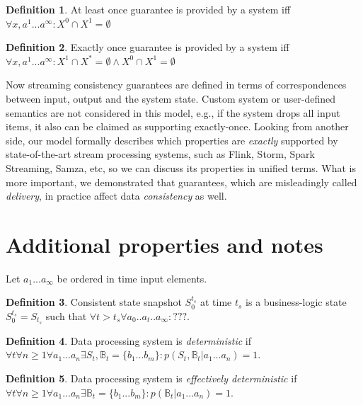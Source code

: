 \documentclass[sigconf]{acmart}
\theoremstyle{definition}
\newtheorem{definition}{Definition}
\begin{document}
\begin{definition}{At least once}
guarantee is provided by a system iff $\forall{x,a^{1}...a^\infty}:X^{0}\cap{X^{1}}=\emptyset$
\end{definition}

\begin{definition}{Exactly once}
guarantee is provided by a system iff $\forall{x,a^{1}...a^\infty}:X^{1}\cap{X^{*}}=\emptyset \wedge X^{0}\cap{X^{1}}=\emptyset$
\end{definition}

Now streaming consistency guarantees are defined in terms of correspondences between input, output and the system state. Custom system or user-defined semantics are not considered in this model, e.g., if the system drops all input items, it also can be claimed as supporting exactly-once. Looking from another side, our model formally describes which properties are {\em exactly} supported by state-of-the-art stream processing systems, such as Flink, Storm, Spark Streaming, Samza, etc, so we can discuss its properties in unified terms. What is more important, we demonstrated that guarantees, which are misleadingly called {\em delivery}, in practice affect data {\em consistency} as well.

\section{Additional properties and notes}

Let $a_1...a_\infty$ be ordered in time input elements.

\begin{definition}{Consistent state snapshot}
$S^{t_s}_0$ at time $t_s$ is a business-logic state $S^{t_s}_0=S_{t_s}$ such that $\forall{t>{t_s}} \forall{a_0..a_t..a_\infty}:???$.
\end{definition}

\begin{definition}{Data processing system is {\em deterministic}}
if \\
$\forall{t} \forall{n\geq1} \forall{a_1...a_n}\exists{S_t,\mathbb{B}_t={\{b_1...b_m\}}}:p(S_t,\mathbb{B}_t|a_1...a_n)=1$.
\end{definition}

\begin{definition}{Data processing system is {\em effectively deterministic}}
if $\forall{t} \forall{n\geq1} \forall{a_1...a_n}\exists{\mathbb{B}_t={\{b_1...b_m\}}}:p(\mathbb{B}_t|a_1...a_n)=1$.
\end{definition}



\end{document}
